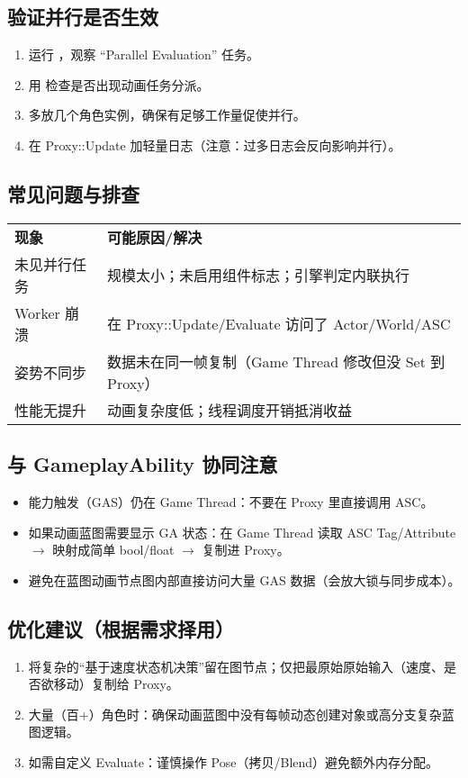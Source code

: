\documentclass[10pt,openright,oneside,CJKmath]{MyBook}
\begin{document}
\subsection{验证并行是否生效}
\begin{enumerate}
  \item 运行 ，观察 “Parallel Evaluation” 任务。
  \item 用  检查是否出现动画任务分派。
  \item 多放几个角色实例，确保有足够工作量促使并行。
  \item 在 Proxy::Update 加轻量日志（注意：过多日志会反向影响并行）。
\end{enumerate}

\subsection{常见问题与排查}
\begin{tabular}{p{4.2cm} p{10cm}}
\textbf{现象} & \textbf{可能原因/解决} \\
未见并行任务 & 规模太小；未启用组件标志；引擎判定内联执行 \\
Worker 崩溃 & 在 Proxy::Update/Evaluate 访问了 Actor/World/ASC \\
姿势不同步 & 数据未在同一帧复制（Game Thread 修改但没 Set 到 Proxy） \\
性能无提升 & 动画复杂度低；线程调度开销抵消收益 \\
\end{tabular}

\subsection{与 GameplayAbility 协同注意}
\begin{itemize}
  \item 能力触发（GAS）仍在 Game Thread：不要在 Proxy 里直接调用 ASC。
  \item 如果动画蓝图需要显示 GA 状态：在 Game Thread 读取 ASC Tag/Attribute $\rightarrow$ 映射成简单 bool/float $\rightarrow$ 复制进 Proxy。
  \item 避免在蓝图动画节点图内部直接访问大量 GAS 数据（会放大锁与同步成本）。
\end{itemize}

\subsection{优化建议（根据需求择用）}
\begin{enumerate}
  \item 将复杂的“基于速度状态机决策”留在图节点；仅把最原始原始输入（速度、是否欲移动）复制给 Proxy。
  \item 大量（百+）角色时：确保动画蓝图中没有每帧动态创建对象或高分支复杂蓝图逻辑。
  \item 如需自定义 Evaluate：谨慎操作 Pose（拷贝/Blend）避免额外内存分配。
\end{enumerate}
\end{document}
